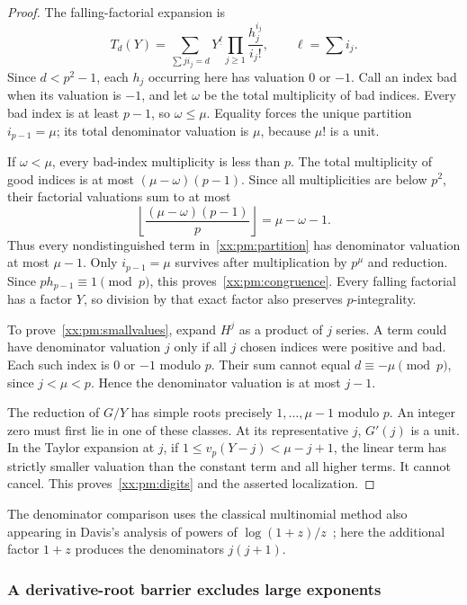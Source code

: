 \documentclass[11pt,a4paper]{article}
\numberwithin{equation}{section}
\theoremstyle{definition}
\theoremstyle{remark}
\theoremstyle{plain}
\newcommand{\fall}[2]{#1^{\underline{#2}}}
\begin{document}
\begin{proof}
The falling-factorial expansion is
\begin{equation}\label{xx:pm:partition}
 T_d(Y)=\sum_{\sum ji_j=d}\fall Y\ell\prod_{j\ge1}\frac{h_j^{i_j}}{i_j!},
 \qquad \ell=\sum i_j.
\end{equation}
Since $d<p^2-1$, each $h_j$ occurring here has valuation $0$ or $-1$. Call an
index bad when its valuation is $-1$, and let $\omega$ be the total multiplicity
of bad indices. Every bad index is at least $p-1$, so $\omega\le \mu$. Equality
forces the unique partition $i_{p-1}=\mu$; its total denominator valuation is
$\mu$, because $\mu!$ is a unit.

If $\omega<\mu$, every bad-index multiplicity is less than $p$. The total
multiplicity of good indices is at most $(\mu-\omega)(p-1)$. Since all
multiplicities are below $p^2$, their factorial valuations sum to at most
\[
 \left\lfloor\frac{(\mu-\omega)(p-1)}p\right\rfloor=\mu-\omega-1.
\]
Thus every nondistinguished term in~\eqref{xx:pm:partition} has denominator
valuation at most $\mu-1$. Only $i_{p-1}=\mu$ survives after multiplication by
$p^\mu$ and reduction. Since $ph_{p-1}\equiv1\pmod p$, this
proves~\eqref{xx:pm:congruence}. Every falling factorial has a factor $Y$, so
division by that exact factor also preserves $p$-integrality.

To prove~\eqref{xx:pm:smallvalues}, expand $H^j$ as a product of $j$ series. A
term could have denominator valuation $j$ only if all $j$ chosen indices were
positive and bad. Each such index is $0$ or $-1$ modulo $p$. Their sum cannot
equal $d\equiv-\mu\pmod p$, since $j<\mu<p$. Hence the denominator valuation is
at most $j-1$.

The reduction of $G/Y$ has simple roots precisely $1,\ldots,\mu-1$ modulo $p$.
An integer zero must first lie in one of these classes. At its representative
$j$, $G'(j)$ is a unit. In the Taylor expansion at $j$, if
$1\le v_p(Y-j)<\mu-j+1$, the linear term has strictly smaller valuation than
the constant term and all higher terms. It cannot cancel.
This proves~\eqref{xx:pm:digits} and the asserted localization.
\end{proof}

The denominator comparison uses the classical multinomial method also appearing
in Davis's analysis of powers of $\log(1+z)/z$~\cite{xx-davis}; here the
additional factor $1+z$ produces the denominators $j(j+1)$.

\subsubsection{A derivative-root barrier excludes large exponents}
\end{document}
